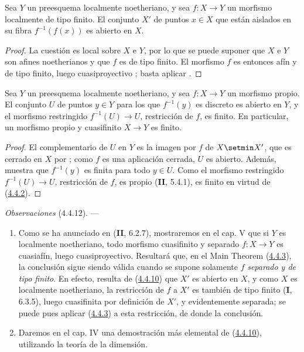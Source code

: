 \begin{proposition}[4.4.10]
\label{III.4.4.10}
\label{III.4.4.10-fr}
Sea $Y$ un preesquema localmente noetheriano, y sea $f:X\to Y$ un
morfismo localmente de tipo finito. El conjunto $X'$ de puntos
$x\in X$ que están aislados en su fibra $f^{-1}(f(x))$ es abierto en
$X$.
\end{proposition}

\begin{proof}
La cuestión es local sobre $X$ e $Y$, por lo que se puede suponer que
$X$ e $Y$ son afines noetherianos y que $f$ es de tipo finito. El
morfismo $f$ es entonces afín y de tipo finito, luego
cuasiproyectivo ; basta aplicar
.
\end{proof}


\begin{corollary}[4.4.11]
\label{III.4.4.11}
\label{III.4.4.11-fr}
Sea $Y$ un preesquema localmente noetheriano, y sea $f:X\to Y$ un
morfismo propio. El conjunto $U$ de puntos $y\in Y$ para los que
$f^{-1}(y)$ es discreto es abierto en $Y$, y el morfismo restringido
$f^{-1}(U)\to U$, restricción de $f$, es
finito. En particular, un morfismo propio y cuasifinito $X\to Y$ es finito.
\end{corollary}

\begin{proof}
El complementario de $U$ en $Y$ es la imagen por $f$ de $X\setmin X'$, que
es cerrado en $X$ por ; como $f$ es una aplicación
cerrada, $U$ es abierto. Además,  muestra que
$f^{-1}(y)$ es finita para todo $y\in U$. Como el morfismo restringido
$f^{-1}(U)\to U$, restricción de $f$, es propio (\textbf{II}, 5.4.1), es finito en
virtud de (\hyperref[III.4.4.2-fr]{4.4.2}).
\end{proof}

\begin{env}[4.4.12]
\label{III.4.4.12-fr}
\emph{Observaciones} (4.4.12). ---
\begin{enumerate}
\item[(i)] Como se ha anunciado en (\textbf{II}, 6.2.7), mostraremos en el cap. V
que si $Y$ es localmente noetheriano, todo morfismo cuasifinito y separado
$f:X\to Y$ es cuasiafín, luego cuasiproyectivo. Resultará que, en el
Main Theorem (\hyperref[III.4.4.3-fr]{4.4.3}), la conclusión sigue siendo válida
cuando se supone solamente $f$ \emph{separado y de tipo finito}. En efecto, resulta
de (\hyperref[III.4.4.10-fr]{4.4.10}) que $X'$ es abierto en $X$, y como
$X$ es localmente noetheriano, la restricción de $f$ a $X'$ es también de
tipo finito (\textbf{I}, 6.3.5), luego cuasifinita por definición de $X'$, y evidentemente
separada; se puede pues aplicar (\hyperref[III.4.4.3-fr]{4.4.3}) a esta
restricción, de donde la conclusión.

\item[(ii)] Daremos en el cap. IV una demostración más elemental de
(\hyperref[III.4.4.10-fr]{4.4.10}), utilizando la teoría de la dimensión.
\end{enumerate}
\end{env}

